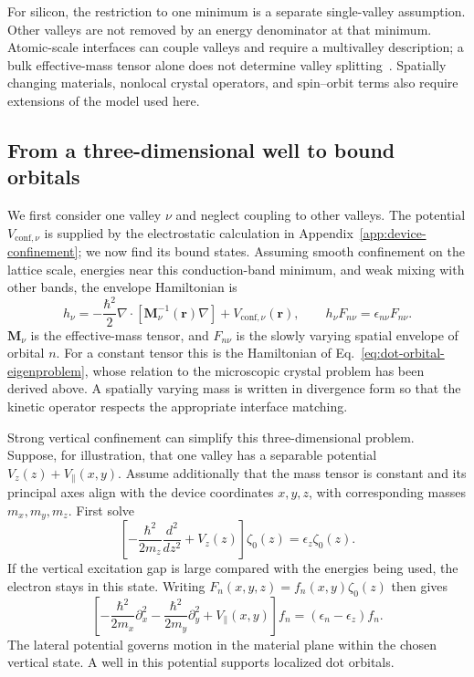 For silicon, the restriction to one minimum is a separate
single-valley assumption. Other valleys are not removed by an
energy denominator at that minimum. Atomic-scale interfaces can
couple valleys and require a multivalley description; a bulk
effective-mass tensor alone does not determine valley splitting~\cite{Zwanenburg2013}.
Spatially changing materials, nonlocal crystal operators, and
spin--orbit terms also require extensions of the model used here.

\subsection{From a three-dimensional well to bound orbitals}
\label{sec:device-bound-orbitals}

We first consider one valley $\nu$ and neglect coupling to other
valleys. The potential $V_{\mathrm{conf},\nu}$ is supplied by the
electrostatic calculation in Appendix~\ref{app:device-confinement};
we now find its bound states. Assuming smooth confinement on the lattice scale,
energies near this conduction-band minimum, and weak mixing with
other bands, the envelope Hamiltonian is
\begin{equation}
 h_\nu=-\frac{\hbar^2}{2}\nabla\cdot
                  [\mathbf M_\nu^{-1}(\mathbf r)\nabla]
              +V_{\mathrm{conf},\nu}(\mathbf r),
 \qquad
 h_\nu F_{n\nu}=\epsilon_{n\nu}F_{n\nu}.
 \label{eq:device-envelope-hamiltonian}
\end{equation}
$\mathbf M_\nu$ is the effective-mass tensor, and $F_{n\nu}$ is the
slowly varying spatial envelope of orbital $n$.
For a constant tensor this is the Hamiltonian of
Eq.~\eqref{eq:dot-orbital-eigenproblem}, whose relation to the microscopic
crystal problem has been derived above.
A spatially varying mass is written in divergence form so that
the kinetic operator respects the appropriate interface matching.

Strong vertical confinement can simplify this three-dimensional
problem. Suppose, for illustration, that one valley has a separable
potential $V_z(z)+V_\parallel(x,y)$. Assume additionally that the
mass tensor is constant and its principal axes align with the device
coordinates $x,y,z$, with corresponding masses $m_x,m_y,m_z$. First solve
\begin{equation}
 \left[-\frac{\hbar^2}{2m_z}\frac{d^2}{dz^2}+V_z(z)\right]\zeta_0(z)
       =\epsilon_z\zeta_0(z).
 \label{eq:device-vertical-state}
\end{equation}
If the vertical excitation gap is large compared with the energies
being used, the electron stays in this state. Writing
$F_n(x,y,z)=f_n(x,y)\zeta_0(z)$ then gives
\begin{equation}
 \left[-\frac{\hbar^2}{2m_x}\partial_x^2
       -\frac{\hbar^2}{2m_y}\partial_y^2
       +V_\parallel(x,y)\right]f_n
        =(\epsilon_n-\epsilon_z)f_n.
 \label{eq:device-lateral-state}
\end{equation}
The lateral potential governs motion in the material plane
within the chosen vertical state. A well in this potential
supports localized dot orbitals.

